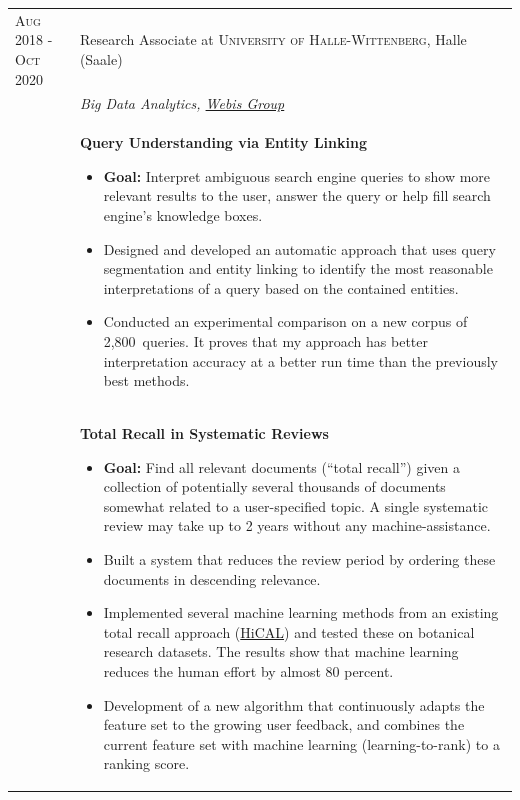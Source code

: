 \documentclass[a4paper,10pt]{article} %
\begin{document}
\begin{longtable}{l p{11cm}}
\textsc{Aug 2018 - Oct 2020} & Research Associate at \textsc{University of Halle-Wittenberg}, Halle (Saale)
\\
& \emph{Big Data Analytics, \href{https://webis.de}{Webis Group}}\\[1mm]
& \textbf{\footnotesize{Query Understanding via Entity Linking}}\vspace{0.2em}
  {\footnotesize
  	\begin{itemize}
  		\setlength\itemsep{0.2em}
 		\item \textbf{Goal:} Interpret ambiguous search engine queries to show more relevant results to the user, answer the query or help fill search engine's knowledge boxes. 
 		\item Designed and developed an automatic approach that uses query segmentation and entity linking to identify the most reasonable interpretations of a query based on the contained entities. 
		\item Conducted an experimental comparison on a new corpus of 2,800~queries. It proves that my approach has better interpretation accuracy at a better run time than the previously best methods.    
  \end{itemize}
  }
\\[-2mm]
& \textbf{\footnotesize{Total Recall in Systematic Reviews}}\vspace{0.2em}
  {\footnotesize
  	\begin{itemize}
  		\setlength\itemsep{0.2em}
 		\item \textbf{Goal:} Find all relevant documents (“total recall”) given a collection of potentially several thousands of documents somewhat related to a user-specified topic. A single systematic review may take up to 2 years without any machine-assistance. 
 		\item Built a system that reduces the review period by ordering these documents in descending relevance. 
 		\item Implemented several machine learning methods from an existing total recall approach (\href{https://github.com/hical/HiCAL}{HiCAL}) and tested these on botanical research datasets. The results show that machine learning reduces the human effort by almost 80 percent. 
		\item Development of a new algorithm that continuously adapts the feature set to the growing user feedback, and combines the current feature set with machine learning (learning-to-rank) to a ranking score.    
  \end{itemize}
  }
\\[-2mm]

\end{longtable}
\end{document}
